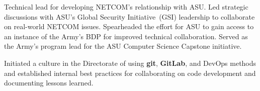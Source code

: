 \begin{rExperience}
  \item Technical lead for developing NETCOM's relationship with ASU. Led strategic discussions with ASU's Global Security
    Initiative~(GSI) leadership to collaborate on real-world NETCOM issues. Spearheaded the effort for ASU to gain
    access to an instance of the Army's BDP for improved technical collaboration. Served as the Army's program lead for
    the ASU Computer Science Capstone initiative.

  \item Initiated a culture in the Directorate of using \textbf{git}, \textbf{GitLab}, and DevOps methods and
    established internal best practices for collaborating on code development and documenting lessons learned.

\end{rExperience}

